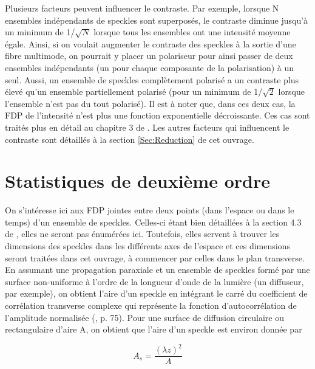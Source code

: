 \documentclass{article}       %
\begin{document}
Plusieurs facteurs peuvent influencer le contraste. Par exemple, lorsque N ensembles indépendants de speckles sont superposés, le contraste diminue jusqu'à un minimum de 1/$\sqrt{N}$ lorsque tous les ensembles ont une intensité moyenne égale. Ainsi, si on voulait augmenter le contraste des speckles à la sortie d'une fibre multimode, on pourrait y placer un polariseur pour ainsi passer de deux ensembles indépendants (un pour chaque composante de la polarisation) à un seul. Aussi, un ensemble de speckles complètement polarisé a un contraste plus élevé qu'un ensemble partiellement polarisé (pour un minimum de 1/$\sqrt{2}$ lorsque l'ensemble n'est pas du tout polarisé). Il est à noter que, dans ces deux cas, la FDP de l'intensité n'est plus une fonction exponentielle décroissante. Ces cas sont traités plus en détail au chapitre 3 de \cite{Manuel}. Les autres facteurs qui influencent le contraste sont détaillés à la section \ref{Sec:Reduction} de cet ouvrage.\\

\bigskip





\section{Statistiques de deuxième ordre}
\label{méthodes_expérimentales}

On s'intéresse ici aux FDP jointes entre deux points (dans l'espace ou dans le temps) d'un ensemble de speckles. Celles-ci étant bien détaillées à la section 4.3 de \cite{Manuel}, elles ne seront pas énumérées ici. Toutefois, elles servent à trouver les dimensions des speckles dans les différents axes de l'espace et ces dimensions seront traitées dans cet ouvrage, à commencer par celles dans le plan transverse. En assumant une propagation paraxiale et un ensemble de speckles formé par une surface non-uniforme à l'ordre de la longueur d'onde de la lumière (un diffuseur, par exemple), on obtient l'aire d'un speckle en intégrant le carré du coefficient de corrélation transverse complexe qui représente la fonction d'autocorrélation de l'amplitude normalisée (\cite{Manuel}, p. 75). Pour une surface de diffusion circulaire ou rectangulaire d'aire A, on obtient que l'aire d'un speckle est environ donnée par

\begin{equation}
    A_{s} = \frac{(\lambda z)^2}{A}
\end{equation}
\end{document}
